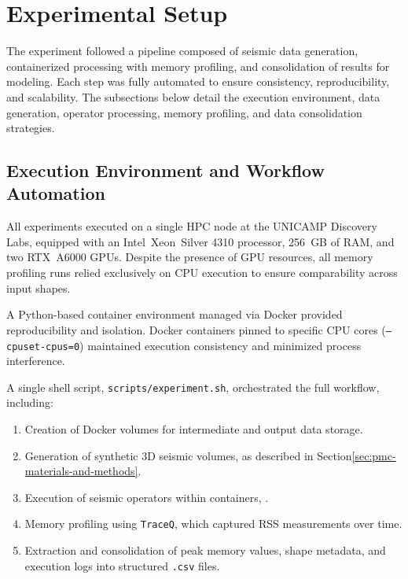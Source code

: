 \section{Experimental Setup}
\label{sec:pmc-experimental-setup}

The experiment followed a pipeline composed of seismic data generation, containerized processing with memory profiling, and consolidation of results for modeling.
Each step was fully automated to ensure consistency, reproducibility, and scalability.
The subsections below detail the execution environment, data generation, operator processing, memory profiling, and data consolidation strategies.

\subsection{Execution Environment and Workflow Automation}
\label{subsec:pmc-execution-environment-and-workflow-automation}

All experiments  executed on a single \ac{HPC} node at the \ac{UNICAMP} Discovery Labs, equipped with an Intel\textregistered\ Xeon\textregistered\ Silver 4310 processor, 256~\ac{GB} of \ac{RAM}, and two \ac{RTX}~A6000 \ac{GPU}s. Despite the presence of \ac{GPU} resources, all memory profiling runs relied exclusively on \ac{CPU} execution to ensure comparability across input shapes.

A Python-based container environment managed via Docker provided reproducibility and isolation.
Docker containers pinned to specific \ac{CPU} cores (\texttt{–cpuset-cpus=0}) maintained execution consistency and minimized process interference.

A single shell script, \texttt{scripts/experiment.sh}\cite{delucca2025experiment2script}, orchestrated the full workflow, including:
\begin{enumerate}
    \item Creation of Docker volumes for intermediate and output data storage.
    \item Generation of synthetic \ac{3D} seismic volumes, as described in Section\ref{sec:pmc-materials-and-methods}.
    \item Execution of seismic operators within containers, .
    \item Memory profiling using \texttt{TraceQ}, which captured \ac{RSS} measurements over time.
    \item Extraction and consolidation of peak memory values, shape metadata, and execution logs into structured \texttt{.csv} files.
\end{enumerate}

